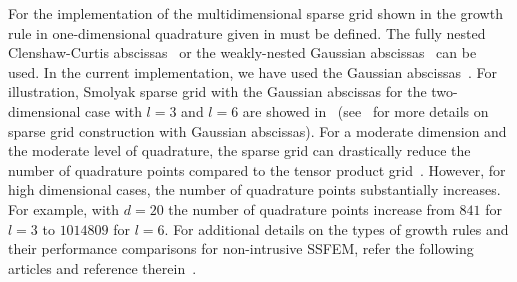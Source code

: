 \documentclass[letter,1p,11pt,oneside,onecolumn,sort&compress]{elsarticle}
\begin{document}
For the implementation of the multidimensional sparse grid shown in  the growth rule in one-dimensional quadrature given in  must be defined. The fully nested Clenshaw-Curtis abscissas~\cite{eldred2009recent,smith2013uncertainty} or the weakly-nested Gaussian abscissas~\cite{eldred2009recent,smith2013uncertainty} can be used.
In the current implementation, we have used the Gaussian abscissas~\cite{eldred2009recent,smith2013uncertainty}.
For illustration, Smolyak sparse grid with the Gaussian abscissas for the two-dimensional case with $l=3$ and $l=6$ are showed in~ (see~ for more details on sparse grid construction with Gaussian abscissas).
For a moderate dimension and the moderate level of quadrature, the sparse grid can drastically reduce the number of quadrature points compared to the tensor product grid~\cite{ganapathysubramanian2007sparse,nobile2008sparse,eldred2009comparison}. However, for high dimensional cases, the number of quadrature points substantially increases. For example,
with $d=20$ the number of quadrature points increase from $841$ for $l=3$ to $1014809$ for $l=6$.
For additional details on the types of growth rules and their performance comparisons for non-intrusive SSFEM, refer the following articles and reference therein~\cite{ganapathysubramanian2007sparse,nobile2008sparse,eldred2009recent,smith2013uncertainty}.
\end{document}
